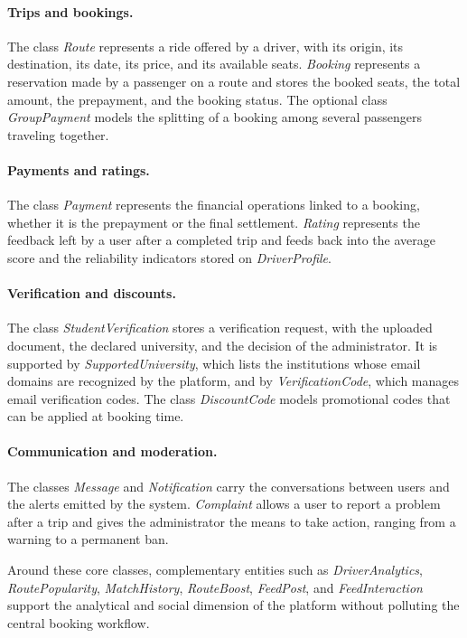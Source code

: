 \paragraph{Trips and bookings.} The class \textit{Route} represents a ride offered by a driver, with its origin, its destination, its date, its price, and its available seats. \textit{Booking} represents a reservation made by a passenger on a route and stores the booked seats, the total amount, the prepayment, and the booking status. The optional class \textit{GroupPayment} models the splitting of a booking among several passengers traveling together.

\paragraph{Payments and ratings.} The class \textit{Payment} represents the financial operations linked to a booking, whether it is the prepayment or the final settlement. \textit{Rating} represents the feedback left by a user after a completed trip and feeds back into the average score and the reliability indicators stored on \textit{DriverProfile}.

\paragraph{Verification and discounts.} The class \textit{StudentVerification} stores a verification request, with the uploaded document, the declared university, and the decision of the administrator. It is supported by \textit{SupportedUniversity}, which lists the institutions whose email domains are recognized by the platform, and by \textit{VerificationCode}, which manages email verification codes. The class \textit{DiscountCode} models promotional codes that can be applied at booking time.

\paragraph{Communication and moderation.} The classes \textit{Message} and \textit{Notification} carry the conversations between users and the alerts emitted by the system. \textit{Complaint} allows a user to report a problem after a trip and gives the administrator the means to take action, ranging from a warning to a permanent ban.

Around these core classes, complementary entities such as \textit{DriverAnalytics}, \textit{RoutePopularity}, \textit{MatchHistory}, \textit{RouteBoost}, \textit{FeedPost}, and \textit{FeedInteraction} support the analytical and social dimension of the platform without polluting the central booking workflow.

